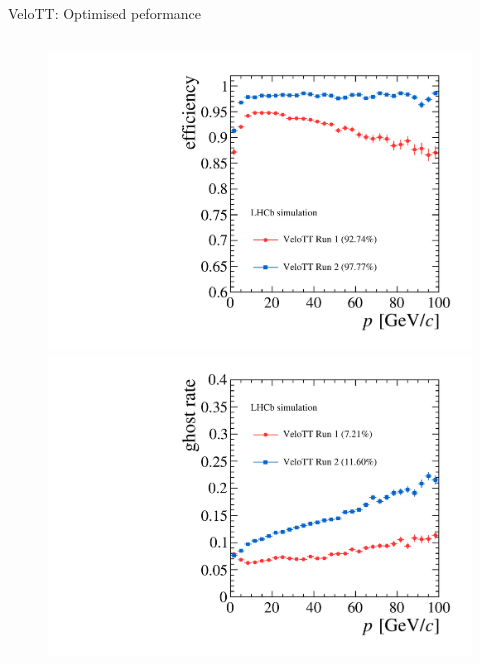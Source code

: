 \documentclass[aspectratio=1610]{beamer}
\begin{document}
\begin{frame}{VeloTT: Optimised peformance}
\begin{columns}
\begin{column}{0.35\textwidth}
\centering
\begin{figure}
\vspace*{-1cm}
\includegraphics[height=0.475\textheight]{figs/upstream-tracking-run2/VeloTT-eff-p.pdf}\\
\includegraphics[height=0.475\textheight]{figs/upstream-tracking-run2/VeloTT-gr-p.pdf}
\end{figure}
\end{column}
\end{columns}

\end{frame}
\end{document}
